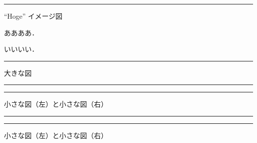 \documentclass[9pt,a4paper]{ltjsarticle}                %
\begin{document}
\begin{multicols}{2}

\begin{Figure}
    \centering
    \iffigure
    \rule{50mm}{30mm}
    \fi
    \captionsetup{type=figure}
    \caption{``Hoge'' イメージ図}
\end{Figure}




ああああ．


いいいい．


\begin{Figure}
    \centering
    \iffigure
    \rule{50mm}{30mm}
    \fi
    \captionsetup{type=figure}
    \caption{大きな図}
\end{Figure}
\begin{Figure}
    \begin{minipage}{0.49\hsize}
        \centering
        \iffigure
        \rule{35mm}{30mm}
        \fi
    \end{minipage}
    \begin{minipage}{0.49\hsize}
        \centering
        \iffigure
        \rule{35mm}{30mm}
        \fi
    \end{minipage}
    \captionsetup{type=figure}
    \caption{小さな図（左）と小さな図（右）}
\end{Figure}
\begin{Figure}
    \begin{minipage}{0.49\hsize}
        \centering
        \iffigure
        \rule{35mm}{30mm}
        \fi
    \end{minipage}
    \begin{minipage}{0.49\hsize}
        \centering
        \iffigure
        \rule{35mm}{30mm}
        \fi
    \end{minipage}
    \captionsetup{type=figure}
    \caption{小さな図（左）と小さな図（右）}
\end{Figure}



\end{multicols}
\end{document}
